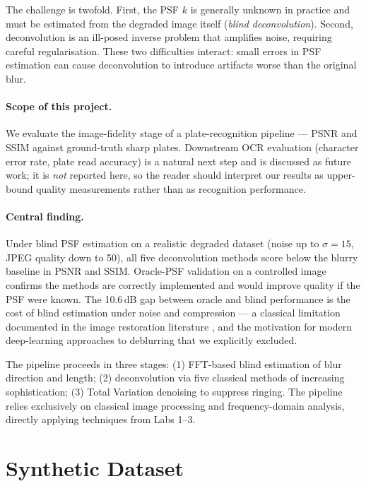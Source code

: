 \documentclass[12pt,a4paper]{article}
\begin{document}
The challenge is twofold. First, the PSF $k$ is generally unknown in
practice and must be estimated from the degraded image itself
(\textit{blind deconvolution}). Second, deconvolution is an ill-posed
inverse problem that amplifies noise, requiring careful regularisation.
These two difficulties interact: small errors in PSF estimation can
cause deconvolution to introduce artifacts worse than the original blur.

\paragraph{Scope of this project.} We evaluate the image-fidelity stage
of a plate-recognition pipeline --- PSNR and SSIM against ground-truth
sharp plates. Downstream OCR evaluation (character error rate, plate
read accuracy) is a natural next step and is discussed as future work;
it is \textit{not} reported here, so the reader should interpret our
results as upper-bound quality measurements rather than as recognition
performance.

\paragraph{Central finding.} Under blind PSF estimation on a realistic
degraded dataset (noise up to $\sigma=15$, JPEG quality down to 50), all
five deconvolution methods score below the blurry baseline in PSNR and
SSIM. Oracle-PSF validation on a controlled image confirms the methods
are correctly implemented and would improve quality if the PSF were
known. The 10.6\,dB gap between oracle and blind performance is the cost
of blind estimation under noise and compression --- a classical
limitation documented in the image restoration literature
\cite{gonzalez2018}, and the motivation for modern deep-learning
approaches to deblurring that we explicitly excluded.

The pipeline proceeds in three stages: (1) FFT-based blind estimation
of blur direction and length; (2) deconvolution via five classical
methods of increasing sophistication; (3) Total Variation denoising to
suppress ringing. The pipeline relies exclusively on classical image
processing and frequency-domain analysis, directly applying techniques
from Labs 1--3.

\section{Synthetic Dataset}
\end{document}
